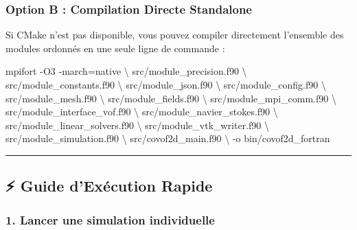 \documentclass[
  french,
]{article}
\newenvironment{Shaded}{}{}
\newcommand{\AttributeTok}[1]{\textcolor[rgb]{0.49,0.56,0.16}{#1}}
\newcommand{\DataTypeTok}[1]{\textcolor[rgb]{0.56,0.13,0.00}{#1}}
\newcommand{\ExtensionTok}[1]{#1}
\newcommand{\NormalTok}[1]{#1}
\newcommand{\OperatorTok}[1]{\textcolor[rgb]{0.40,0.40,0.40}{#1}}
\begin{document}
\subsubsection{Option B : Compilation Directe
Standalone}\label{option-b-compilation-directe-standalone}

Si CMake n'est pas disponible, vous pouvez compiler directement
l'ensemble des modules ordonnés en une seule ligne de commande :

\begin{Shaded}
\begin{Highlighting}[]
\ExtensionTok{mpifort} \AttributeTok{{-}O3} \AttributeTok{{-}march}\OperatorTok{=}\NormalTok{native }\DataTypeTok{\textbackslash{}}
\NormalTok{  src/module\_precision.f90 }\DataTypeTok{\textbackslash{}}
\NormalTok{  src/module\_constants.f90 }\DataTypeTok{\textbackslash{}}
\NormalTok{  src/module\_json.f90 }\DataTypeTok{\textbackslash{}}
\NormalTok{  src/module\_config.f90 }\DataTypeTok{\textbackslash{}}
\NormalTok{  src/module\_mesh.f90 }\DataTypeTok{\textbackslash{}}
\NormalTok{  src/module\_fields.f90 }\DataTypeTok{\textbackslash{}}
\NormalTok{  src/module\_mpi\_comm.f90 }\DataTypeTok{\textbackslash{}}
\NormalTok{  src/module\_interface\_vof.f90 }\DataTypeTok{\textbackslash{}}
\NormalTok{  src/module\_navier\_stokes.f90 }\DataTypeTok{\textbackslash{}}
\NormalTok{  src/module\_linear\_solvers.f90 }\DataTypeTok{\textbackslash{}}
\NormalTok{  src/module\_vtk\_writer.f90 }\DataTypeTok{\textbackslash{}}
\NormalTok{  src/module\_simulation.f90 }\DataTypeTok{\textbackslash{}}
\NormalTok{  src/covof2d\_main.f90 }\DataTypeTok{\textbackslash{}}
  \AttributeTok{{-}o}\NormalTok{ bin/covof2d\_fortran}
\end{Highlighting}
\end{Shaded}

\begin{center}\rule{0.5\linewidth}{0.5pt}\end{center}

\subsection{⚡ Guide d'Exécution
Rapide}\label{guide-dexuxe9cution-rapide}

\subsubsection{1. Lancer une simulation
individuelle}\label{lancer-une-simulation-individuelle}
\end{document}
